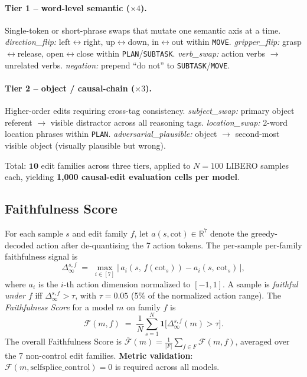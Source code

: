 \documentclass{article}
\begin{document}
\paragraph{Tier 1 -- word-level semantic ($\times 4$).} Single-token or short-phrase swaps that mutate one semantic axis at a time. \emph{direction\_flip:} left$\leftrightarrow$right, up$\leftrightarrow$down, in$\leftrightarrow$out within \texttt{MOVE}. \emph{gripper\_flip:} grasp$\leftrightarrow$release, open$\leftrightarrow$close within \texttt{PLAN}/\texttt{SUBTASK}. \emph{verb\_swap:} action verbs $\to$ unrelated verbs. \emph{negation:} prepend ``do not'' to \texttt{SUBTASK}/\texttt{MOVE}.

\paragraph{Tier 2 -- object / causal-chain ($\times 3$).} Higher-order edits requiring cross-tag consistency. \emph{subject\_swap:} primary object referent $\to$ visible distractor across all reasoning tags. \emph{location\_swap:} 2-word location phrases within \texttt{PLAN}. \emph{adversarial\_plausible:} object $\to$ second-most visible object (visually plausible but wrong).

Total: $\mathbf{10}$ edit families across three tiers, applied to $N{=}100$ LIBERO samples each, yielding \textbf{1{,}000 causal-edit evaluation cells per model}.

\subsection{Faithfulness Score}

For each sample $s$ and edit family $f$, let $a(s, \text{cot}) \in \mathbb{R}^7$ denote the greedy-decoded action after de-quantising the 7 action tokens. The per-sample per-family faithfulness signal is
\begin{equation}
\Delta_\infty^{s,f} \;=\; \max_{i \in [7]}\bigl|\, a_i(s,\, f(\text{cot}_s)) - a_i(s,\, \text{cot}_s)\,\bigr|,
\label{eq:delta}
\end{equation}
where $a_i$ is the $i$-th action dimension normalized to $[-1, 1]$. A sample is \emph{faithful under $f$} iff $\Delta_\infty^{s,f} > \tau$, with $\tau = 0.05$ (5\% of the normalized action range). The \emph{Faithfulness Score} for a model $m$ on family $f$ is
\begin{equation}
\mathcal{F}(m, f) \;=\; \frac{1}{N} \sum_{s=1}^N \mathbf{1}\!\bigl[\Delta_\infty^{s,f}(m) > \tau\bigr].
\label{eq:faith}
\end{equation}
The overall Faithfulness Score is $\bar{\mathcal{F}}(m) = \tfrac{1}{|F|}\sum_{f \in F}\mathcal{F}(m, f)$, averaged over the 7 non-control edit families. \textbf{Metric validation}: $\mathcal{F}(m, \text{selfsplice\_control}) = 0$ is required across all models.
\end{document}
